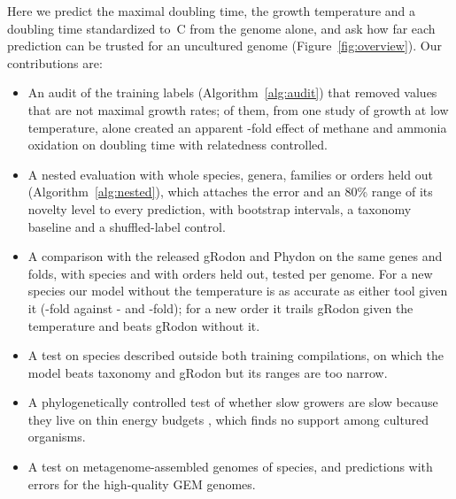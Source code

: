 Here we predict the maximal doubling time, the growth temperature and a doubling time standardized to \TRefC\,\textdegree C
from the genome alone, and ask how far each prediction can be trusted for an uncultured genome
(Figure~\ref{fig:overview}). Our contributions are:
\begin{itemize}
\item An audit of the training labels (Algorithm~\ref{alg:audit}) that removed \NExcluded values that are not maximal growth
rates; \NExcludedKevbrinaWord of them, from one study of growth at low temperature, alone created an apparent
\KevFoldWith-fold effect of methane and ammonia oxidation on doubling time with relatedness controlled.
\item A nested evaluation with whole species, genera, families or orders held out (Algorithm~\ref{alg:nested}), which
attaches the error and an 80\% range of its novelty level to every prediction, with bootstrap intervals, a taxonomy
baseline and a shuffled-label control.
\item A comparison with the released gRodon and Phydon on the same genes and folds, with species and with orders held out,
tested per genome. For a new species our model without the temperature is as accurate as either tool given it
(\RelOursErr-fold against \RelGRodonErr- and \RelPhydonErr-fold); for a new order it trails gRodon given the temperature and
beats gRodon without it.
\item A test on \ExtN species described outside both training compilations, on which the model beats taxonomy and gRodon
but its ranges are too narrow.
\item A phylogenetically controlled test of whether slow growers are slow because they live on thin energy budgets
\citep{hoehler2013,lever2015}, which finds no support among cultured organisms.
\item A test on \MagNGenomes metagenome-assembled genomes of \MagNSpecies species, and predictions with errors for the
\NGEMPredicted high-quality GEM genomes.
\end{itemize}
